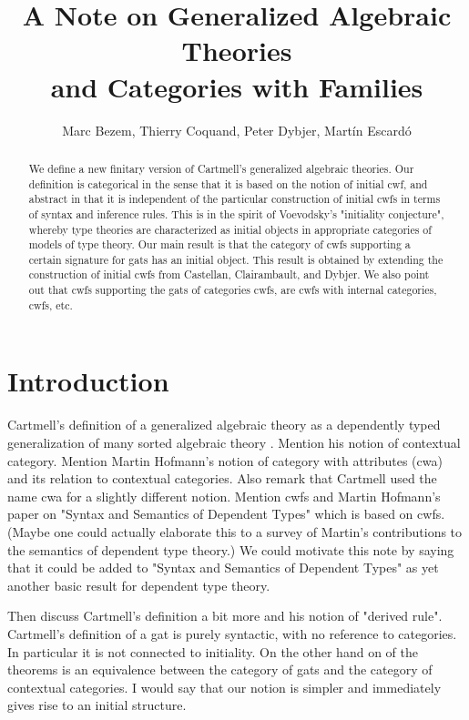 \documentclass{lmcs}
\title[Generalized Algebraic Theories and Categories with Families]{A Note on Generalized Algebraic Theories\\and Categories with Families}\author{Marc Bezem, Thierry Coquand, Peter Dybjer, Mart\'in Escard\'o}
\begin{document}
\maketitle

\begin{abstract}
We define a new finitary version of Cartmell's generalized algebraic theories. Our definition is categorical in the sense that it is based on the notion of initial cwf, and abstract in that it is independent of the particular construction of initial cwfs in terms of syntax and inference rules. This is in the spirit of Voevodsky's "initiality conjecture", whereby type theories are characterized as initial objects in appropriate categories of models of type theory.  Our main result is that the category of cwfs supporting a certain signature for gats has an initial object. This result is obtained by extending the construction of initial cwfs from Castellan, Clairambault, and Dybjer. We also point out that cwfs supporting the gats of categories cwfs, are cwfs with internal categories, cwfs, etc.
\end{abstract}

\section{Introduction}

Cartmell's definition of a generalized algebraic theory as a dependently typed generalization of many sorted algebraic theory \cite{cartmell:phd,cartmell:}. Mention his notion of contextual category. Mention Martin Hofmann's notion of category with attributes (cwa) and its relation to contextual categories. Also remark that Cartmell used the name cwa for a slightly different notion. Mention cwfs and Martin Hofmann's paper on "Syntax and Semantics of Dependent Types" which is based on cwfs. (Maybe one could actually elaborate this to a survey of Martin's contributions to the semantics of dependent type theory.) We could motivate this note by saying that it could be added to "Syntax and Semantics of Dependent Types" as yet another basic result for dependent type theory.

Then discuss Cartmell's definition a bit more and his notion of "derived rule". Cartmell's definition of a gat is purely syntactic, with no reference to categories. In particular it is not connected to initiality. On the other hand on of the theorems is an equivalence between the category of gats and the category of contextual categories. I would say that our notion is simpler and immediately gives rise to an initial structure.
\end{document}
